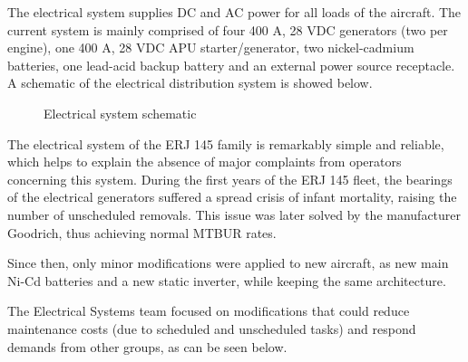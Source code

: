 The electrical system supplies DC and AC power for all loads of the aircraft. The current system is mainly comprised of four 400 A, 28 VDC generators (two per engine), one 400 A, 28 VDC APU starter/generator, two nickel-cadmium batteries, one lead-acid backup battery and an external power source receptacle. A schematic of the electrical distribution system is showed below.

\begin{figure}[H] %
\caption{Electrical system schematic}
\label{fig:145eletrical}
\end{figure}

The electrical system of the ERJ 145 family is remarkably simple and reliable, which helps to explain the absence of major complaints from operators concerning this system.
During the first years of the ERJ 145 fleet, the bearings of the electrical generators suffered a spread crisis of infant mortality, raising the number of unscheduled removals. This issue was later solved by the manufacturer Goodrich, thus achieving normal MTBUR rates.

Since then, only minor modifications were applied to new aircraft, as new main Ni-Cd batteries and a new static inverter, while keeping the same architecture.

The Electrical Systems team focused on modifications that could reduce maintenance costs (due to scheduled and unscheduled tasks) and respond demands from other groups, as can be seen below.
